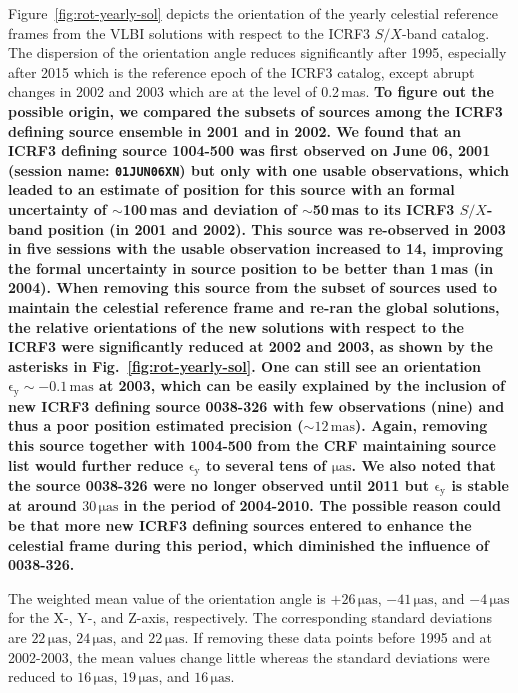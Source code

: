 \documentclass{aa}
\begin{document}
    
    Figure~\ref{fig:rot-yearly-sol} depicts the orientation of the yearly celestial reference frames from the VLBI solutions with respect to the ICRF3 $S/X$-band catalog.
    The dispersion of the orientation angle reduces significantly after 1995, especially after 2015 which is the reference epoch of the ICRF3 catalog, except abrupt changes in 2002 and 2003 which are at the level of 0.2\,mas.
    \textbf{To figure out the possible origin, we compared the subsets of sources among the ICRF3 defining source ensemble in 2001 and in 2002.
    We found that an ICRF3 defining source 1004-500 was first observed on June 06, 2001 (session name: \texttt{01JUN06XN}) but only with one usable observations, which leaded to an estimate of position for this source with an formal uncertainty of $\sim$100\,mas and deviation of $\sim$50\,mas to its ICRF3 $S/X$-band position (in 2001 and 2002).
    This source was re-observed in 2003 in five sessions with the usable observation increased to 14, improving the formal uncertainty in source position to be better than 1\,mas (in 2004).
    When removing this source from the subset of sources used to maintain the celestial reference frame and re-ran the global solutions, the relative orientations of the new solutions with respect to the ICRF3 were significantly reduced at 2002 and 2003, as shown by the asterisks in Fig.~\ref{fig:rot-yearly-sol}.
    One can still see an orientation $\mathrm{\epsilon_y\sim-0.1\,mas}$ at 2003, which can be easily explained by the inclusion of new ICRF3 defining source 0038-326 with few observations (nine) and thus a poor position estimated precision ($\mathrm{\sim12\,mas}$).
    Again, removing this source together with 1004-500 from the CRF maintaining source list would further reduce $\mathrm{\epsilon_y}$ to several tens of $\mathrm{\mu as}$.
    We also noted that the source 0038-326 were no longer observed until 2011 but $\mathrm{\epsilon_y}$ is stable at around $\mathrm{30\,\mu as}$ in the period of 2004-2010.
    The possible reason could be that more new ICRF3 defining sources entered to enhance the celestial frame during this period, which diminished the influence of 0038-326.
    }
    
    The weighted mean value of the orientation angle is $\mathrm{+26\,\mu as}$, $\mathrm{-41\,\mu as}$, and $\mathrm{-4\,\mu as}$ for the X-, Y-, and Z-axis, respectively.
    The corresponding standard deviations are $\mathrm{22\,\mu as}$, $\mathrm{24\,\mu as}$, and $\mathrm{22\,\mu as}$.
    If removing these data points before 1995 and at 2002-2003, the mean values change little whereas the standard deviations were reduced to $\mathrm{16\,\mu as}$, $\mathrm{19\,\mu as}$, and $\mathrm{16\,\mu as}$.
    
\end{document}
